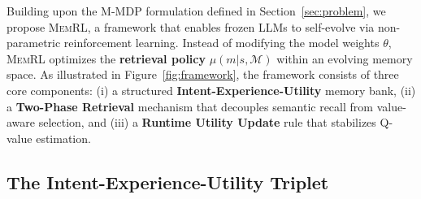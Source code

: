 \documentclass{article}
\theoremstyle{plain}
\theoremstyle{definition}
\theoremstyle{remark}
\begin{document}
Building upon the M-MDP formulation defined in Section~\ref{sec:problem}, we propose \textsc{MemRL}, a framework that enables frozen LLMs to self-evolve via non-parametric reinforcement learning. Instead of modifying the model weights $\theta$, \textsc{MemRL} optimizes the \textbf{retrieval policy} $\mu(m| s, \mathcal{M})$ within an evolving memory space. As illustrated in Figure~\ref{fig:framework}, the framework consists of three core components: (i) a structured \textbf{Intent-Experience-Utility} memory bank, (ii) a \textbf{Two-Phase Retrieval} mechanism that decouples semantic recall from value-aware selection, and (iii) a \textbf{Runtime Utility Update} rule that stabilizes Q-value estimation.



\subsection{The Intent-Experience-Utility Triplet}
\label{subsec:memory_repr}
\end{document}
